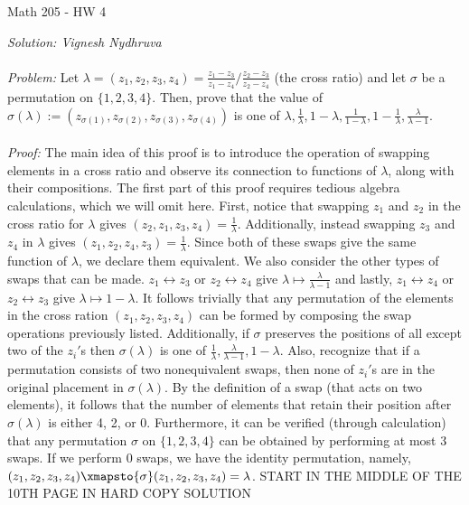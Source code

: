 

\begin{center}
	Math 205 - HW 4
\end{center} 

\noindent \textit{Solution: Vignesh Nydhruva} 
\\ 
\\
\textit{Problem: } Let $\lambda = (z_1,z_2,z_3,z_4) = \frac{z_1 - z_3}{z_1 - z_4} / \frac{z_2 - z_3}{z_2 - z_4}$ (the cross ratio) and let $\sigma$ be a permutation on $\{1,2,3,4\}$. Then, prove that the value of $\sigma(\lambda) := (z_{\sigma(1)}, z_{\sigma(2)}, z_{\sigma(3)}, z_{\sigma(4)})$ is one of $\lambda, \frac{1}{\lambda}, 1 - \lambda, \frac{1}{1-\lambda}, 1 - \frac{1}{\lambda}, \frac{\lambda}{\lambda - 1}$. 
\\
\\
\textit{Proof: } The main idea of this proof is to introduce the operation of swapping elements in a cross ratio and observe its connection to functions of $\lambda$, along with their compositions. The first part of this proof requires tedious algebra calculations, which we will omit here. First, notice that swapping $z_1$ and $z_2$ in the cross ratio for $\lambda$ gives $(z_2,z_1,z_3,z_4) = \frac{1}{\lambda}$. Additionally, instead swapping $z_3$ and $z_4$ in $\lambda$ gives $(z_1,z_2,z_4,z_3) = \frac{1}{\lambda}$. Since both of these swaps give the same function of $\lambda$, we declare them equivalent. We also consider the other types of swaps that can be made. $z_1 \leftrightarrow z_3$ or $z_2 \leftrightarrow z_4$ give $\lambda \mapsto \frac{\lambda}{\lambda - 1}$ and lastly, $z_1 \leftrightarrow z_4$ or $z_2 \leftrightarrow z_3$ give $\lambda \mapsto 1 - \lambda$. It follows trivially that any permutation of the elements in the cross ration $(z_1,z_2,z_3,z_4)$ can be formed by composing the swap operations previously listed. Additionally, if $\sigma$ preserves the positions of all except two of the $z_i'$s then $\sigma(\lambda)$ is one of $\frac{1}{\lambda}, \frac{\lambda}{\lambda - 1}, 1 - \lambda$. Also, recognize that if a permutation consists of two nonequivalent swaps, then none of $z_i'$s are in the original placement in $\sigma(\lambda)$. By the definition of a swap (that acts on two elements), it follows that the number of elements that retain their position after $\sigma(\lambda)$ is either 4, 2, or 0. Furthermore, it can be verified (through calculation) that any permutation $\sigma$ on $\{1,2,3,4\}$ can be obtained by performing at most 3 swaps. If we perform 0 swaps, we have the identity permutation, namely, $(z_1,z_2,z_3,z_4) \xmapsto{\sigma} (z_1,z_2,z_3,z_4) = \lambda$. START IN THE MIDDLE OF THE 10TH PAGE IN HARD COPY SOLUTION


